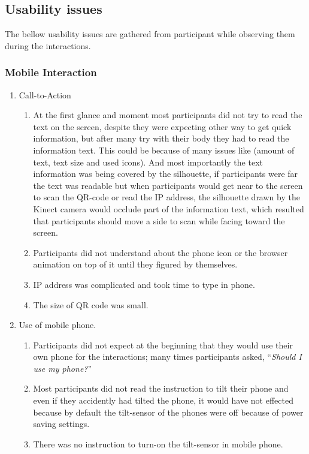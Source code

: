 \subsection{Usability issues}
The bellow usability issues are gathered from participant while observing them during the interactions.
\subsubsection{Mobile Interaction}
\begin{enumerate}
\item	Call-to-Action
\begin{enumerate}
\item	At the first glance and moment most participants did not try to read the text on the screen, despite they were expecting other way to get quick information, but after many try with their body they had to read the information text. This could be because of many issues like (amount of text, text size and used icons). And most importantly the text information was being covered by the silhouette, if participants were far the text was readable but when participants would get near to the screen to scan the QR-code or read the IP address, the silhouette drawn by the Kinect camera would occlude part of the information text, which resulted that participants should move a side to scan while facing toward the screen.
\item	Participants did not understand about the phone icon or the browser animation on top of it until they figured by themselves.
\item	IP address was complicated and took time to type in phone.
\item	The size of QR code was small.
\end{enumerate}

\item	Use of mobile phone.
\begin{enumerate}
\item	Participants did not expect at the beginning that they would use their own phone for the interactions; many times participants asked, ``\emph{Should I use my phone?}'' 
\item	Most participants did not read the instruction to tilt their phone and even if they accidently had tilted the phone, it would have not effected because by default the tilt-sensor of the phones were off because of power saving settings. 
\item	There was no instruction to turn-on the tilt-sensor in mobile phone.
\end{enumerate}


\end{enumerate}
